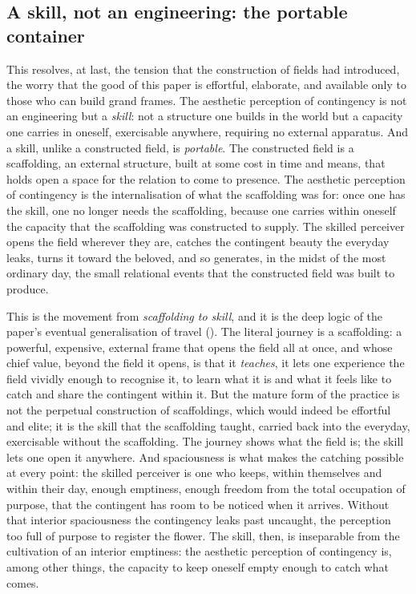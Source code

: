 \subsection{A skill, not an engineering: the portable container}
\label{p21:sub:ap-skill}

This resolves, at last, the tension that the construction of fields had introduced, the worry that the good of this paper is effortful, elaborate, and available only to those who can build grand frames. The aesthetic perception of contingency is not an engineering but a \emph{skill}: not a structure one builds in the world but a capacity one carries in oneself, exercisable anywhere, requiring no external apparatus. And a skill, unlike a constructed field, is \emph{portable}. The constructed field is a scaffolding, an external structure, built at some cost in time and means, that holds open a space for the relation to come to presence. The aesthetic perception of contingency is the internalisation of what the scaffolding was for: once one has the skill, one no longer needs the scaffolding, because one carries within oneself the capacity that the scaffolding was constructed to supply. The skilled perceiver opens the field wherever they are, catches the contingent beauty the everyday leaks, turns it toward the beloved, and so generates, in the midst of the most ordinary day, the small relational events that the constructed field was built to produce.

This is the movement from \emph{scaffolding to skill}, and it is the deep logic of the paper's eventual generalisation of travel (). The literal journey is a scaffolding: a powerful, expensive, external frame that opens the field all at once, and whose chief value, beyond the field it opens, is that it \emph{teaches}, it lets one experience the field vividly enough to recognise it, to learn what it is and what it feels like to catch and share the contingent within it. But the mature form of the practice is not the perpetual construction of scaffoldings, which would indeed be effortful and elite; it is the skill that the scaffolding taught, carried back into the everyday, exercisable without the scaffolding. The journey shows what the field is; the skill lets one open it anywhere. And spaciousness is what makes the catching possible at every point: the skilled perceiver is one who keeps, within themselves and within their day, enough emptiness, enough freedom from the total occupation of purpose, that the contingent has room to be noticed when it arrives. Without that interior spaciousness the contingency leaks past uncaught, the perception too full of purpose to register the flower. The skill, then, is inseparable from the cultivation of an interior emptiness: the aesthetic perception of contingency is, among other things, the capacity to keep oneself empty enough to catch what comes.

